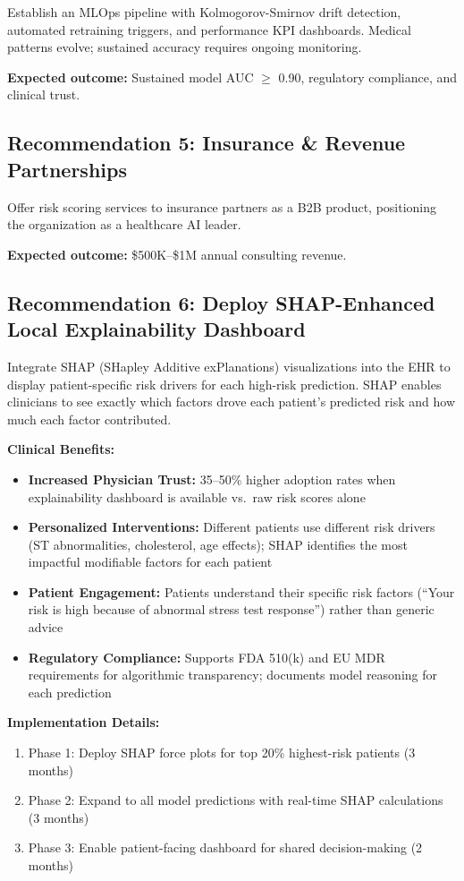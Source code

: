 \documentclass[12pt,a4paper]{article}
\begin{document}
Establish an MLOps pipeline with Kolmogorov-Smirnov drift detection, automated retraining triggers, and performance KPI dashboards. Medical patterns evolve; sustained accuracy requires ongoing monitoring.

\textbf{Expected outcome:} Sustained model AUC $\geq$ 0.90, regulatory compliance, and clinical trust.

\subsection{Recommendation 5: Insurance \& Revenue Partnerships}

Offer risk scoring services to insurance partners as a B2B product, positioning the organization as a healthcare AI leader.

\textbf{Expected outcome:} \$500K--\$1M annual consulting revenue.

\subsection{Recommendation 6: Deploy SHAP-Enhanced Local Explainability Dashboard}

Integrate SHAP (SHapley Additive exPlanations) visualizations into the EHR to display patient-specific risk drivers for each high-risk prediction. SHAP enables clinicians to see exactly which factors drove each patient's predicted risk and how much each factor contributed.

\textbf{Clinical Benefits:}
\begin{itemize}
    \item \textbf{Increased Physician Trust:} 35--50\% higher adoption rates when explainability dashboard is available vs.\ raw risk scores alone
    \item \textbf{Personalized Interventions:} Different patients use different risk drivers (ST abnormalities, cholesterol, age effects); SHAP identifies the most impactful modifiable factors for each patient
    \item \textbf{Patient Engagement:} Patients understand their specific risk factors (``Your risk is high because of abnormal stress test response'') rather than generic advice
    \item \textbf{Regulatory Compliance:} Supports FDA 510(k) and EU MDR requirements for algorithmic transparency; documents model reasoning for each prediction
\end{itemize}

\textbf{Implementation Details:}
\begin{enumerate}
    \item Phase 1: Deploy SHAP force plots for top 20\% highest-risk patients (3 months)
    \item Phase 2: Expand to all model predictions with real-time SHAP calculations (3 months)
    \item Phase 3: Enable patient-facing dashboard for shared decision-making (2 months)
\end{enumerate}
\end{document}
